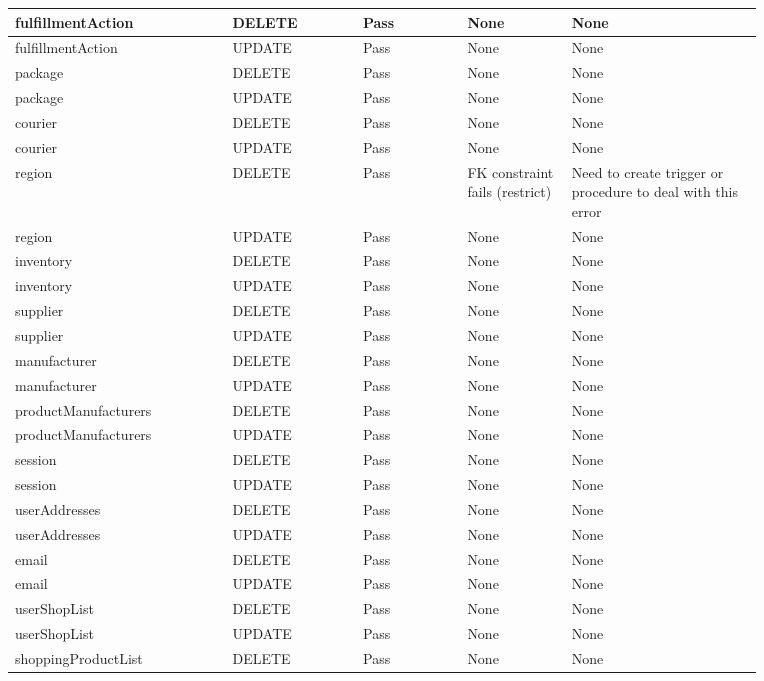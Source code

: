 \begin{spacing}{1.25}
\begin{longtable}{ | p{0.25\linewidth} | p{0.15\linewidth} | p{0.126\linewidth} | p{0.128\linewidth} | p{0.22\linewidth} | }
fulfillmentAction			&	DELETE		&	Pass		&	None							&	None				\\\hline
fulfillmentAction			&	UPDATE		&	Pass		&	None							&	None				\\\hline
package						&	DELETE		&	Pass		&	None							&	None				\\\hline
package						&	UPDATE		&	Pass		&	None							&	None				\\\hline
courier						&	DELETE		&	Pass		&	None							&	None				\\\hline
courier						&	UPDATE		&	Pass		&	None							&	None				\\\hline
region						&	DELETE		&	Pass		&	FK constraint fails (restrict)	&	Need to create trigger or procedure to deal with this error\\\hline
region						&	UPDATE		&	Pass		&	None							&	None				\\\hline
inventory					&	DELETE		&	Pass		&	None							&	None				\\\hline
inventory					&	UPDATE		&	Pass		&	None							&	None				\\\hline
supplier					&	DELETE		&	Pass		&	None							&	None				\\\hline
supplier					&	UPDATE		&	Pass		&	None							&	None				\\\hline
manufacturer				&	DELETE		&	Pass		&	None							&	None				\\\hline
manufacturer				&	UPDATE		&	Pass		&	None							&	None				\\\hline
productManufacturers		&	DELETE		&	Pass		&	None							&	None				\\\hline
productManufacturers		&	UPDATE		&	Pass		&	None							&	None				\\\hline
session						&	DELETE		&	Pass		&	None							&	None				\\\hline
session						&	UPDATE		&	Pass		&	None							&	None				\\\hline
userAddresses				&	DELETE		&	Pass		&	None							&	None				\\\hline
userAddresses				&	UPDATE		&	Pass		&	None							&	None				\\\hline
email						&	DELETE		&	Pass		&	None							&	None				\\\hline
email						&	UPDATE		&	Pass		&	None							&	None				\\\hline
userShopList				&	DELETE		&	Pass		&	None							&	None				\\\hline
userShopList				&	UPDATE		&	Pass		&	None							&	None				\\\hline
shoppingProductList			&	DELETE		&	Pass		&	None							&	None				\\\hline

\end{longtable}
\end{spacing}
